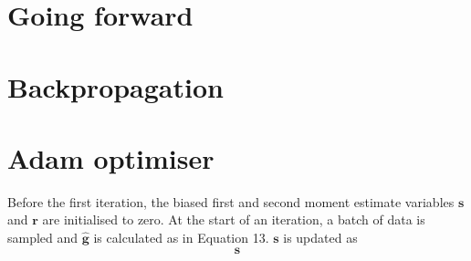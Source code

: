 \documentclass[12pt]{article}
\begin{document}
\section{Going forward}




\appendix
\appendixpage
\section{Backpropagation}
\section{Adam optimiser}
Before the first iteration, the biased first and second moment estimate variables $\bm{s}$ and $\bm{r}$ are initialised to zero. At the start of an iteration, a batch of data is sampled and $\hat{\bm{g}}$ is calculated as in Equation 13. $\bm{s}$ is updated as
\begin{equation}
\bm{s}
\end{equation}        
\end{document}
